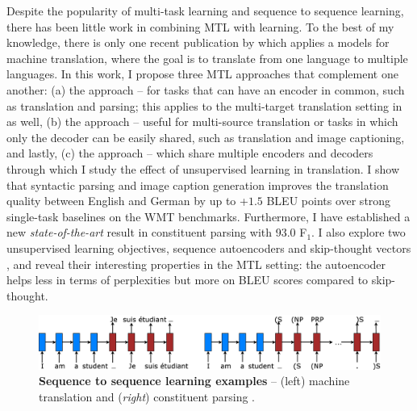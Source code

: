 Despite the popularity of multi-task learning and sequence to sequence
learning, there has been little work in combining MTL with \ssl{}
learning. To the best of my knowledge, there is only one recent
publication by  which applies a \ssl{} models for machine
translation, where the goal is to translate from one language to
multiple languages.
In this work, I propose three MTL
approaches that complement one another: (a) the {\it \otm} approach -- for
tasks that can have an encoder in common, such as translation and parsing; this 
applies to the multi-target translation setting in \cite{dong15} as well, (b)
the {\it \mto} approach -- useful for multi-source
translation or tasks in which only the decoder can be easily shared,
such as translation and image captioning, and lastly, (c) the {\it \mtm} approach -- which share
multiple encoders and decoders through which I study the effect of unsupervised
learning in translation.
I show
that syntactic parsing and image caption generation improves the
translation quality between English and German by up to +$1.5$ BLEU points over
strong single-task baselines on the WMT benchmarks. 
Furthermore, I have established a new {\it state-of-the-art} result in
constituent parsing with 93.0 F$_1$.
I also explore two unsupervised learning
objectives, sequence autoencoders \cite{dai15} and skip-thought vectors
\cite{kiros15skip}, and reveal their interesting properties in the MTL setting: the autoencoder helps less in terms of
  perplexities but more on BLEU scores compared to skip-thought.
\begin{figure}%
\centering
\includegraphics[width=1\textwidth, clip=true, trim= 0 0 0
0]{img/6-1_seq2seq}
\caption[Sequence to sequence learning examples]{{\bf Sequence to sequence learning examples} -- (left) machine
translation \cite{sutskever14} and ({\it right}) constituent parsing
\cite{vinyals15grammar}.}
\label{f:s2s}
\end{figure}


